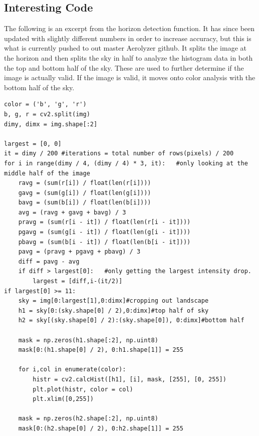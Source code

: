 \documentclass[onecolumn, draftclsnofoot,10pt, compsoc]{IEEEtran}
\begin{document}
\begin{singlespace}
	\section{Interesting Code}
		The following is an excerpt from the horizon detection function.
		It has since been updated with slightly different numbers in order to increase accuracy, but this is what is currently pushed to out master Aerolyzer github.
		It splits the image at the horizon and then splits the sky in half to analyze the histogram data in both the top and bottom half of the sky.
		These are used to further determine if the image is actually valid.
		If the image is valid, it moves onto color analysis with the bottom half of the sky.
		\begin{lstlisting}
color = ('b', 'g', 'r')
b, g, r = cv2.split(img)
dimy, dimx = img.shape[:2]

largest = [0, 0]
it = dimy / 200 #iterations = total number of rows(pixels) / 200
for i in range(dimy / 4, (dimy / 4) * 3, it):   #only looking at the middle half of the image
	ravg = (sum(r[i]) / float(len(r[i])))
	gavg = (sum(g[i]) / float(len(g[i])))
	bavg = (sum(b[i]) / float(len(b[i])))
	avg = (ravg + gavg + bavg) / 3
	pravg = (sum(r[i - it]) / float(len(r[i - it])))
	pgavg = (sum(g[i - it]) / float(len(g[i - it])))
	pbavg = (sum(b[i - it]) / float(len(b[i - it])))
	pavg = (pravg + pgavg + pbavg) / 3
	diff = pavg - avg
	if diff > largest[0]:   #only getting the largest intensity drop.
		largest = [diff,i-(it/2)]
if largest[0] >= 11:
	sky = img[0:largest[1],0:dimx]#cropping out landscape
	h1 = sky[0:(sky.shape[0] / 2),0:dimx]#top half of sky
	h2 = sky[(sky.shape[0] / 2):(sky.shape[0]), 0:dimx]#bottom half

	mask = np.zeros(h1.shape[:2], np.uint8)
	mask[0:(h1.shape[0] / 2), 0:h1.shape[1]] = 255

	for i,col in enumerate(color):
		histr = cv2.calcHist([h1], [i], mask, [255], [0, 255])
		plt.plot(histr, color = col)
		plt.xlim([0,255])

	mask = np.zeros(h2.shape[:2], np.uint8)
	mask[0:(h2.shape[0] / 2), 0:h2.shape[1]] = 255


\end{lstlisting}
\end{singlespace}
\end{document}
